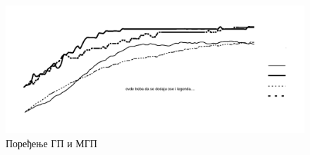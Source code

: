 \documentclass[a4paper]{article}
\begin{document}
\begin{figure}[h!]
    \begin{center}
    \includegraphics[scale=0.15]{mgp_poredjenje.png}
    \end{center}
    \caption{Поређење ГП и МГП}
    \label{fig:mgp_poredjenje}
\end{figure}


% 
% 
\end{document}
